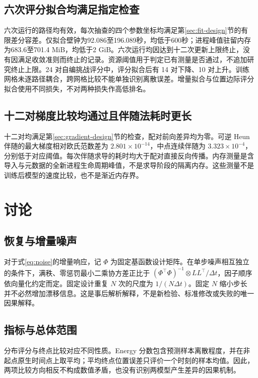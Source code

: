 \documentclass[UTF8,11pt]{ctexart}
\newcommand{\tabfile}[1]{\begin{center}\resizebox{\textwidth}{!}{}\end{center}}
\begin{document}
\subsection{六次评分拟合均满足指定检查}\label{sec:rq3}
\tabfile{o2-feasibility.tex}
六次运行的路径均有效，每次抽查的四个参数坐标均满足第\ref{sec:fit-design}节的有限差分容差。仅拟合壁钟为92.086至196.089秒，均低于600秒；进程峰值驻留内存为683.6至701.4 MiB，均低于2 GiB。六次运行均因达到十二次更新上限终止，没有因满足收敛准则而终止的记录。资源阈值用于判定已有测量是否通过，不追加研究终止上限。24 对自编挑战评分中，评分拟合后有 14 对下降、10 对上升。训练网格未逐路径耦合，跨网格比较不能单独识别离散误差。增量拟合与位置边际评分拟合使用不同损失，不对两种损失作高低排名。

\subsection{十二对梯度比较均通过且伴随法耗时更长}\label{sec:gradient-results}
\tabfile{gradient-routes.tex}
十二对均满足第\ref{sec:gradient-design}节的检查，配对前向差异均为零。可逆 Heun 伴随的最大梯度相对欧氏范数差为 $2.801\times10^{-14}$，中点连续伴随为 $3.323\times10^{-4}$，分别低于对应阈值。每次伴随求导的耗时均大于配对直接反向传播。内存测量是含导入与元数据的全新进程生命周期峰值，不是求导阶段的隔离内存。这些测量不是训练后模型的速度比较，也不是渐近内存界。

\section{讨论}\label{sec:discussion}
\subsection{恢复与增量噪声}
对于式\eqref{eq:noise}的增量响应，记 $\Phi$ 为固定基函数设计矩阵。在单步噪声相互独立的条件下，满秩、零惩罚最小二乘协方差正比于 $(\Phi^\top\Phi)^{-1}\otimes LL^\top/\Delta t$，因子顺序依向量化约定而定。固定设计重复 $N$ 次的尺度为 $1/(N\Delta t)$。固定 $N$ 缩小步长并不必然增加漂移信息。这是事后解析解释，不是新检验、标准修改或失败的唯一因果解释。

\subsection{指标与总体范围}
分布评分与终点比较对应不同性质。Energy 分数包含预测样本离散程度，并在非起点原生时间点上取平均；平均终点位置误差只评价一个时刻的样本均值。因此，两项比较方向相反不构成数值矛盾，也没有识别两模型产生差异的因果机制。
\end{document}
